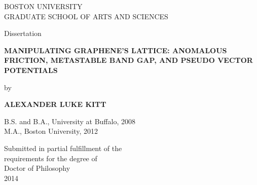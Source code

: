 \begin{titlepage}   %
\begin{center}

  BOSTON UNIVERSITY\\
  GRADUATE SCHOOL OF ARTS AND SCIENCES\\

  \vspace{.5in}

  Dissertation\\

  \vspace{.5in}

  \textbf{MANIPULATING GRAPHENE'S LATTICE: ANOMALOUS FRICTION, METASTABLE BAND GAP, AND PSEUDO VECTOR POTENTIALS}\\

  \vspace{.5in}

  by\\

  \vspace{.5in}

  {\bf ALEXANDER LUKE KITT}\\

  \vspace{.5in}

  \begin{singlespace}
    B.S. and B.A., University at Buffalo, 2008\\
    M.A., Boston University, 2012\\
  \end{singlespace}

  \vfill

  Submitted in partial fulfillment of the\\
  requirements for the degree of\\
  Doctor of Philosophy\\
  2014\\

\end{center}
\end{titlepage}